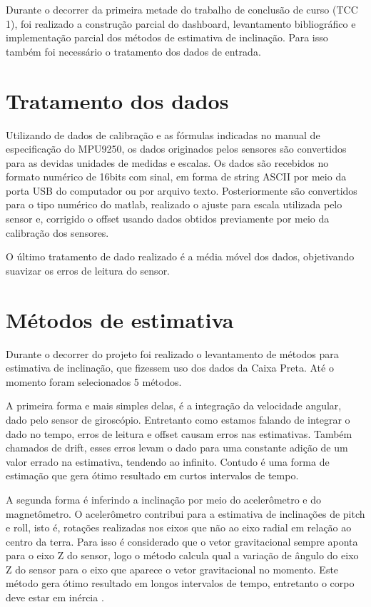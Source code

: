 Durante o decorrer da primeira metade do trabalho de conclusão de curso (TCC 1), foi realizado a construção parcial do dashboard, levantamento bibliográfico e implementação parcial dos métodos de estimativa de inclinação. Para isso também foi necessário o tratamento dos dados de entrada.

\section{Tratamento dos dados}
Utilizando de dados de calibração e as fórmulas indicadas no manual de especificação do MPU9250, os dados originados pelos sensores são convertidos para as devidas unidades de medidas e escalas. Os dados são recebidos no formato numérico de 16bits com sinal, em forma de string ASCII por meio da porta USB do computador ou por arquivo texto. Posteriormente são convertidos para o tipo numérico do matlab, realizado o ajuste para escala utilizada pelo sensor e, corrigido o offset usando dados obtidos previamente por meio da calibração dos sensores.

O último tratamento de dado realizado é a média móvel dos dados, objetivando suavizar os erros de leitura do sensor.  

\section{Métodos de estimativa}
Durante o decorrer do projeto foi realizado o levantamento de métodos para estimativa de inclinação, que fizessem uso dos dados da Caixa Preta. Até o momento foram selecionados 5 métodos.

A primeira forma e mais simples delas, é a integração da velocidade angular, dado pelo sensor de giroscópio. Entretanto como estamos falando de integrar o dado no tempo, erros de leitura e offset causam erros nas estimativas. Também chamados de drift, esses erros levam o dado para uma constante adição de um valor errado na estimativa, tendendo ao infinito. Contudo é uma forma de estimação que gera ótimo resultado em curtos intervalos de tempo.

A segunda forma é inferindo a inclinação por meio do acelerômetro e do magnetômetro. O acelerômetro contribui para a estimativa de inclinações de pitch e roll, isto é, rotações realizadas nos eixos que não ao eixo radial em relação ao centro da terra. Para isso é considerado que o vetor gravitacional sempre aponta para o eixo Z do sensor, logo o método calcula qual a variação de ângulo do eixo Z do sensor para o eixo que aparece o vetor gravitacional no momento. Este método gera ótimo resultado em longos intervalos de tempo, entretanto o corpo deve estar em inércia \cite{pedley_tilt_nodate}.

